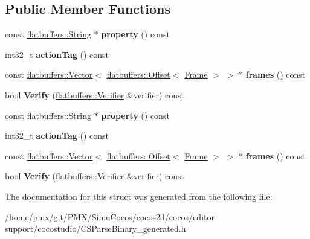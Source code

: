 \subsection*{Public Member Functions}
\begin{DoxyCompactItemize}
\item 
\mbox{\label{structflatbuffers_1_1TimeLine_a477585631fad3c84c9827bb681bc9f88}} 
const \hyperlink{structflatbuffers_1_1String}{flatbuffers\+::\+String} $\ast$ {\bfseries property} () const
\item 
\mbox{\label{structflatbuffers_1_1TimeLine_a773cf202f28c91701bfdc1e2c60ea5ab}} 
int32\+\_\+t {\bfseries action\+Tag} () const
\item 
\mbox{\label{structflatbuffers_1_1TimeLine_a3765750e36e984e0daa4144dfdb893ca}} 
const \hyperlink{classflatbuffers_1_1Vector}{flatbuffers\+::\+Vector}$<$ \hyperlink{structflatbuffers_1_1Offset}{flatbuffers\+::\+Offset}$<$ \hyperlink{structflatbuffers_1_1Frame}{Frame} $>$ $>$ $\ast$ {\bfseries frames} () const
\item 
\mbox{\label{structflatbuffers_1_1TimeLine_a675136ff83313fd9f704b806e677b0e5}} 
bool {\bfseries Verify} (\hyperlink{classflatbuffers_1_1Verifier}{flatbuffers\+::\+Verifier} \&verifier) const
\item 
\mbox{\label{structflatbuffers_1_1TimeLine_a477585631fad3c84c9827bb681bc9f88}} 
const \hyperlink{structflatbuffers_1_1String}{flatbuffers\+::\+String} $\ast$ {\bfseries property} () const
\item 
\mbox{\label{structflatbuffers_1_1TimeLine_a773cf202f28c91701bfdc1e2c60ea5ab}} 
int32\+\_\+t {\bfseries action\+Tag} () const
\item 
\mbox{\label{structflatbuffers_1_1TimeLine_a3765750e36e984e0daa4144dfdb893ca}} 
const \hyperlink{classflatbuffers_1_1Vector}{flatbuffers\+::\+Vector}$<$ \hyperlink{structflatbuffers_1_1Offset}{flatbuffers\+::\+Offset}$<$ \hyperlink{structflatbuffers_1_1Frame}{Frame} $>$ $>$ $\ast$ {\bfseries frames} () const
\item 
\mbox{\label{structflatbuffers_1_1TimeLine_a675136ff83313fd9f704b806e677b0e5}} 
bool {\bfseries Verify} (\hyperlink{classflatbuffers_1_1Verifier}{flatbuffers\+::\+Verifier} \&verifier) const
\end{DoxyCompactItemize}


The documentation for this struct was generated from the following file\+:\begin{DoxyCompactItemize}
\item 
/home/pmx/git/\+P\+M\+X/\+Simu\+Cocos/cocos2d/cocos/editor-\/support/cocostudio/C\+S\+Parse\+Binary\+\_\+generated.\+h\end{DoxyCompactItemize}
